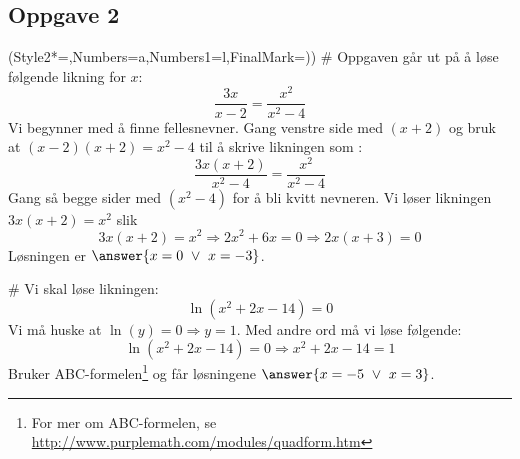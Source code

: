 \subsection*{Oppgave 2}
\begin{easylist}[enumerate]
	\ListProperties(Style2*=,Numbers=a,Numbers1=l,FinalMark={)})
	# Oppgaven går ut på å løse følgende likning for $x$:
	\begin{equation*}
	\frac{3x}{x-2} = \frac{x^2}{x^2 - 4}
	\end{equation*}
	Vi begynner med å finne fellesnevner. Gang venstre side med $(x+2)$ og bruk at $(x-2)(x+2) = x^2 - 4$ til å skrive likningen som :
	\begin{equation*}
	\frac{3x(x+2)}{x^2 - 4} = \frac{x^2}{x^2 - 4}
	\end{equation*}
	Gang så begge sider med $(x^2 - 4)$ for å bli kvitt nevneren. Vi løser likningen $3x(x+2) = x^2$ slik
	\begin{equation*}
	3x(x+2) = x^2 \Rightarrow 2x^2 + 6x = 0 \Rightarrow 2x(x + 3) = 0
	\end{equation*}
	Løsningen er $\answer{x = 0 \ \vee \ x = -3}$.
	
	# Vi skal løse likningen:
	\begin{equation*}
	\ln \left( x^2 + 2x - 14\right) = 0
	\end{equation*}
	Vi må huske at $ \ln (y) = 0 \Rightarrow y = 1$.
	Med andre ord må vi løse følgende:
	\begin{equation*}
	\ln \left( x^2 + 2x - 14\right) = 0 \Rightarrow x^2 + 2x - 14 = 1
	\end{equation*}
	Bruker ABC-formelen\footnote{For mer om ABC-formelen, se \url{http://www.purplemath.com/modules/quadform.htm}} og får løsningene  $\answer{x = -5 \ \vee \ x = 3}$.
\end{easylist}

